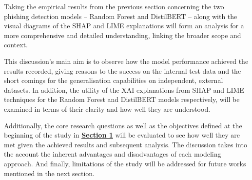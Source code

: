 
Taking the empirical results from the previous section concerning the two phishing detection models -- Random Forest and DistilBERT -- along with the visual diagrams of the SHAP and LIME explanations will form an analysis for a more comprehensive and detailed understanding, linking the broader scope and context.\newline

\noindent This discussion's main aim is to observe how the model performance achieved the results recorded, giving reasons to the success on the internal test data and the short comings for the generalisation capabilities on independent, external datasets. In addition, the utility of the XAI explanations from SHAP and LIME techniques for the Random Forest and DistilBERT models respectively, will be examined in terms of their clarity and how well they are understood.\newline

\noindent Additionally, the core research questions as well as the objectives defined at the beginning of the study in \hyperref[sec:1-introduction]{\uline{\textbf{Section 1}}} will be evaluated to see how well they are met given the achieved results and subsequent analysis. The discussion takes into the account the inherent advantages and disadvantages of each modeling approach. And finally, limitations of the study will be addressed for future works mentioned in the next section.

